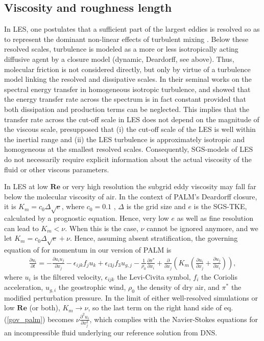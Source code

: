 \documentclass[smallcondensed,final]{svjour3}
\newcommand{\RE}{\mathbf{Re}}
\begin{document}
\subsection{Viscosity and roughness length}

In LES, one postulates that a sufficient part of the largest eddies is resolved so as to represent the dominant non-linear effects of turbulent mixing \citep{pope2004ten}. Below these resolved scales, turbulence is modeled as a more or less isotropically acting diffusive agent by a closure model (dynamic, Deardorff, see above). Thus, molecular friction is not considered directly, but only by virtue of a turbulence model linking the resolved and dissipative scales. In their seminal works on the spectral energy transfer in homogeneous isotropic turbulence, \cite{kolmogorov1941dissipation} and \cite{obukhov1941distribution} showed that the energy transfer rate across the spectrum is in fact constant provided that both dissipation and production terms can be neglected. This implies that the transfer rate across the cut-off scale in LES does not depend on the magnitude of the viscous scale, presupposed that (i) the cut-off scale of the LES is well within the inertial range and (ii) the LES turbulence is approximately isotropic and homogeneous at the smallest resolved scales. Consequently, SGS-models of LES do not necessarily require explicit information about the actual viscosity of the fluid or other viscous parameters.

In LES at low $\RE$ or very high resolution the subgrid eddy viscosity may fall far below the molecular viscosity of air. In the context of PALM's Deardorff closure, it is $K_m = c_0 \Delta \sqrt{e}$, where $c_0 = 0.1$ \citep{deardorff1980stratocumulus}, $\Delta$ is the grid size and $e$ is the SGS-TKE, calculated by a prognostic equation. Hence, very low $e$ as well as fine resolution can lead to $K_m<\nu$. When this is the case, $\nu$ cannot be ignored anymore, and we let $K_m = c_0 \Delta \sqrt{e} + \nu$. Hence, assuming absent stratification, the governing equation of for momentum in our version of PALM is
\begin{align}\label{gov_palm}
  \frac{\partial u_i}{\partial t} = - \frac{\partial u_i u_j}{\partial x_j} -\epsilon_{ijk}f_ju_k + \epsilon_{i3j} f_3 u_{g,j} - \frac{1}{\rho_0}\frac{\partial\pi^*}{\partial x_i} + \frac{\partial}{\partial x_j}\left( K_m\left(\frac{\partial u_i}{\partial x_j} + \frac{\partial u_j}{\partial x_i} \right)\right),
\end{align}
where $u_i$ is the filtered velocity, $\epsilon_{ijk}$ the Levi-Civita symbol, $f_i$ the Coriolis acceleration, $u_{g,i}$ the geostrophic wind, $\rho_0$ the density of dry air, and $\pi^*$ the modified perturbation pressure. In the limit of either well-resolved simulations or low $\RE$ (or both), $K_m \rightarrow \nu$, so the last term on the right hand side of eq. (\ref{gov_palm}) becomes $\nu\frac{\partial^2u_i}{\partial x_j^2}$, which complies with the Navier-Stokes equations for an incompressible fluid underlying our reference solution from DNS.
\end{document}

